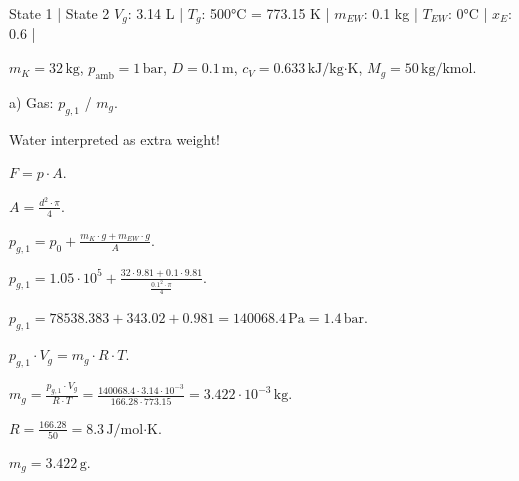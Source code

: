 State 1 | State 2  
\( V_g \): 3.14 L |  
\( T_g \): 500°C = 773.15 K |  
\( m_{EW} \): 0.1 kg |  
\( T_{EW} \): 0°C |  
\( x_E \): 0.6 |  

\( m_K = 32 \, \text{kg} \), \( p_{\text{amb}} = 1 \, \text{bar} \), \( D = 0.1 \, \text{m} \), \( c_V = 0.633 \, \text{kJ/kg·K} \), \( M_g = 50 \, \text{kg/kmol} \).  

a) Gas: \( p_{g,1} \) / \( m_g \).  

Water interpreted as extra weight!  

\( F = p \cdot A \).  

\( A = \frac{d^2 \cdot \pi}{4} \).  

\( p_{g,1} = p_0 + \frac{m_K \cdot g + m_{EW} \cdot g}{A} \).  

\( p_{g,1} = 1.05 \cdot 10^5 + \frac{32 \cdot 9.81 + 0.1 \cdot 9.81}{\frac{0.1^2 \cdot \pi}{4}} \).  

\( p_{g,1} = 78538.383 + 343.02 + 0.981 = 140068.4 \, \text{Pa} = 1.4 \, \text{bar} \).  

\( p_{g,1} \cdot V_g = m_g \cdot R \cdot T \).  

\( m_g = \frac{p_{g,1} \cdot V_g}{R \cdot T} = \frac{140068.4 \cdot 3.14 \cdot 10^{-3}}{166.28 \cdot 773.15} = 3.422 \cdot 10^{-3} \, \text{kg} \).  

\( R = \frac{166.28}{50} = 8.3 \, \text{J/mol·K} \).  

\( m_g = 3.422 \, \text{g} \).